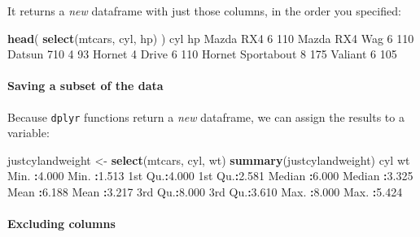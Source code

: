 \documentclass[]{article}
\newenvironment{Shaded}{\begin{snugshade}}{\end{snugshade}}
\newcommand{\DecValTok}[1]{\textcolor[rgb]{0.00,0.00,0.81}{#1}}
\newcommand{\FloatTok}[1]{\textcolor[rgb]{0.00,0.00,0.81}{#1}}
\newcommand{\KeywordTok}[1]{\textcolor[rgb]{0.13,0.29,0.53}{\textbf{#1}}}
\newcommand{\NormalTok}[1]{#1}
\newcommand{\OperatorTok}[1]{\textcolor[rgb]{0.81,0.36,0.00}{\textbf{#1}}}
\newcommand{\StringTok}[1]{\textcolor[rgb]{0.31,0.60,0.02}{#1}}
\let\oldparagraph\paragraph
\renewcommand{\paragraph}[1]{\oldparagraph{#1}\mbox{}}
\begin{document}
It returns a \emph{new} dataframe with just those columns, in the order you
specified:

\begin{Shaded}
\begin{Highlighting}[]
\KeywordTok{head}\NormalTok{(}
  \KeywordTok{select}\NormalTok{(mtcars, cyl, hp)}
\NormalTok{)}
\NormalTok{                  cyl  hp}
\NormalTok{Mazda RX4           }\DecValTok{6} \DecValTok{110}
\NormalTok{Mazda RX4 Wag       }\DecValTok{6} \DecValTok{110}
\NormalTok{Datsun }\DecValTok{710}          \DecValTok{4}  \DecValTok{93}
\NormalTok{Hornet }\DecValTok{4}\NormalTok{ Drive      }\DecValTok{6} \DecValTok{110}
\NormalTok{Hornet Sportabout   }\DecValTok{8} \DecValTok{175}
\NormalTok{Valiant             }\DecValTok{6} \DecValTok{105}
\end{Highlighting}
\end{Shaded}

\hypertarget{saving-a-subset-of-the-data}{%
\paragraph{Saving a subset of the data}\label{saving-a-subset-of-the-data}}

Because \texttt{dplyr} functions return a \emph{new} dataframe, we can assign the results to
a variable:

\begin{Shaded}
\begin{Highlighting}[]
\NormalTok{justcylandweight <-}\StringTok{ }\KeywordTok{select}\NormalTok{(mtcars, cyl, wt)}
\KeywordTok{summary}\NormalTok{(justcylandweight)}
\NormalTok{      cyl              wt       }
\NormalTok{ Min.   }\OperatorTok{:}\FloatTok{4.000}\NormalTok{   Min.   }\OperatorTok{:}\FloatTok{1.513}  
\NormalTok{ 1st Qu.}\OperatorTok{:}\FloatTok{4.000}\NormalTok{   1st Qu.}\OperatorTok{:}\FloatTok{2.581}  
\NormalTok{ Median }\OperatorTok{:}\FloatTok{6.000}\NormalTok{   Median }\OperatorTok{:}\FloatTok{3.325}  
\NormalTok{ Mean   }\OperatorTok{:}\FloatTok{6.188}\NormalTok{   Mean   }\OperatorTok{:}\FloatTok{3.217}  
\NormalTok{ 3rd Qu.}\OperatorTok{:}\FloatTok{8.000}\NormalTok{   3rd Qu.}\OperatorTok{:}\FloatTok{3.610}  
\NormalTok{ Max.   }\OperatorTok{:}\FloatTok{8.000}\NormalTok{   Max.   }\OperatorTok{:}\FloatTok{5.424}  
\end{Highlighting}
\end{Shaded}

\hypertarget{excluding-columns}{%
\paragraph{Excluding columns}\label{excluding-columns}}
\end{document}
